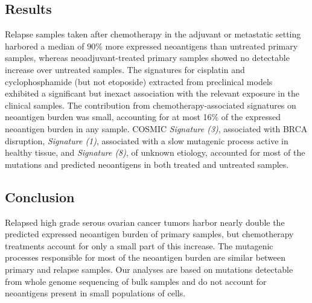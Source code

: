 \subsection*{Results}
Relapse samples taken after chemotherapy in the adjuvant or metastatic setting harbored a median of 90\% more expressed neoantigens than untreated primary samples, whereas neoadjuvant-treated primary samples showed no detectable increase over untreated samples. The signatures for cisplatin and cyclophosphamide (but not etoposide) extracted from preclinical models exhibited a significant but inexact association with the relevant exposure in the clinical samples. The contribution from chemotherapy-associated signatures on neoantigen burden was small, accounting for at most 16\% of the expressed neoantigen burden in any sample. COSMIC \textit{Signature (3)}, associated with BRCA disruption, \textit{Signature (1)}, associated with a slow mutagenic process active in healthy tissue, and \textit{Signature (8)}, of unknown etiology, accounted for most of the mutations and predicted neoantigens in both treated and untreated samples. 

\subsection*{Conclusion}
Relapsed high grade serous ovarian cancer tumors harbor nearly double the predicted expressed neoantigen burden of primary samples, but chemotherapy treatments account for only a small part of this increase. The mutagenic processes responsible for most of the neoantigen burden are similar between primary and relapse samples. Our analyses are based on mutations detectable from whole genome sequencing of bulk samples and do not account for neoantigens present in small populations of cells. 



